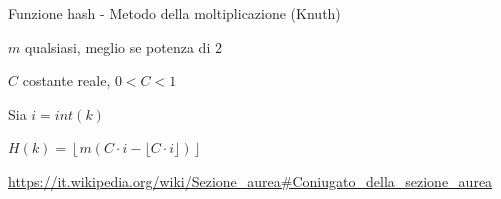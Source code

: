 \begin{frame}{Funzione hash - Metodo della moltiplicazione (Knuth)}

\vspace{-9pt}
\begin{myboxtitle}
\BI
\item $m$ qualsiasi, meglio se potenza di $2$
\item $C$ costante reale, $0 < C < 1$
\item Sia $i = \mathit{int}(k)$
\item $H(k) = \left\lfloor m(C \cdot i - \lfloor C\cdot i \rfloor) \right\rfloor$
\EI
\end{myboxtitle}

\begin{myboxtitle}[Esempio]
\end{myboxtitle}
\tiny \url{https://it.wikipedia.org/wiki/Sezione_aurea\#Coniugato_della_sezione_aurea}
   
\end{frame}

